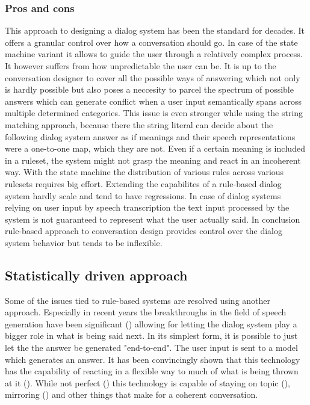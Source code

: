\documentclass[12pt]{report}
\begin{document}
{\subsubsection{Pros and cons}

\par
This approach to designing a dialog system
has been the standard for decades.
It offers a granular control over how a conversation should go.
In case of the state machine variant it
allows to guide the user through a relatively complex process.
It however suffers from how unpredictable the user can be.
It is up to the conversation designer to cover all the possible ways of answering
which not only is hardly possible
but also poses a neccesity to parcel the spectrum of possible answers
which can generate conflict when
a user input semantically spans across multiple determined categories.
This issue is even stronger while using the string matching approach,
because there the string literal can decide about the following dialog system answer
as if meanings and their speech representations were a one-to-one map,
which they are not.
Even if a certain meaning is included in a ruleset,
the system might not grasp the meaning and react in an incoherent way.
With the state machine the
distribution of various rules across various rulesets
requires big effort.
Extending the capabilites of a rule-based dialog system
hardly scale and tend to have regressions.
In case of dialog systems relying on user input by speech transcription
the text input processed by the system is not guaranteed to represent
what the user actually said.
In conclusion rule-based approach to conversation design
provides control over the dialog system behavior
but tends to be inflexible.

\subsection{Statistically driven approach}

Some of the issues tied to rule-based systems
are resolved using another approach.
Especially in recent years the breakthroughs in the field
of speech generation have been significant ()
allowing for letting the dialog system play a bigger role
in what is being said next.
In its simplest form,
it is possible to just let the the answer be generated "end-to-end".
The user input is sent to a model which generates an answer.
It has been convincingly shown that this technology has the capability
of reacting in a flexible way to much of what is being thrown at it ().
While not perfect ()
this technology is capable of staying on topic (), mirroring ()
and other things that make for a coherent conversation.

}
\end{document}
